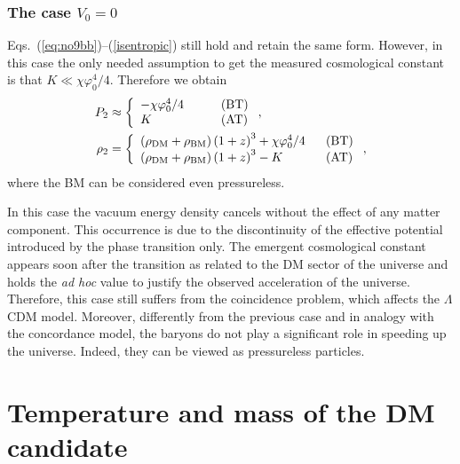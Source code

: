 \documentclass[twocolumn,showpacs, nofootinbib,aps,superscriptaddress, eqsecnum,prd,prl,notitlepage,showkeys,10pt,reprint]{revtex4-1}
\begin{document}
\subsubsection{The case $V_0=0$}

Eqs.~(\ref{eq:no9bb})--(\ref{isentropic}) still hold and retain the same form.
However, in this case the only needed assumption to get the measured cosmological constant is that $K\ll \chi\varphi_0^4/4$.
Therefore we obtain
%
\begin{align}
\label{s8cccc}
P_2&\approx \left\{
\begin{array}{ll}
-\chi \varphi_0^4/4\quad &\quad{\rm (BT)}\\
K\quad&\quad{\rm (AT)}
\end{array}
\right.,\\
\label{s8biscccc}
\rho_2&= \left\{
\begin{array}{ll}
\left(\rho_{\rm DM}+\rho_{\rm BM}\right)\left(1+z\right)^3+\chi \varphi_0^4/4\ &\ {\rm (BT)}\\
\left(\rho_{\rm DM}+\rho_{\rm BM}\right)\left(1+z\right)^3-K\ &\ {\rm (AT)}
\end{array}
\right.,
\end{align}
%
where the BM can be considered even pressureless.

In this case the vacuum energy density cancels without the effect of any matter component.
This occurrence is due to the discontinuity of the effective potential introduced by the phase transition only.
The emergent cosmological constant appears soon after the transition as related to the DM sector of the universe and holds the \textit{ad hoc} value to justify the observed acceleration of the universe.
Therefore, this case still suffers from the coincidence problem, which affects the $\Lambda$CDM model.
Moreover, differently from the previous case and in analogy with the concordance model, the baryons do not play a significant role in speeding up the universe. Indeed, they can be viewed as pressureless particles.


\section{Temperature and mass of the DM candidate}
\label{DMparticle}
\end{document}
